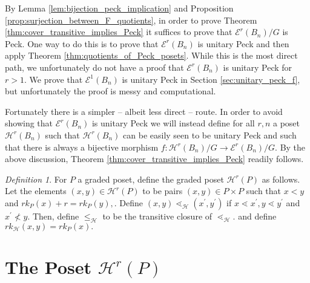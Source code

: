 \documentclass[10 pt]{amsart}
\theoremstyle{plain}
\theoremstyle{definition}
\theoremstyle{remark}
\numberwithin{equation}{section}
\theoremstyle{remark}
\newtheorem{defn}[thm]{Definition}
\begin{document}
By Lemma \ref{lem:bijection_peck_implication} and Proposition \ref{prop:surjection_between_F_quotients}, in order to prove Theorem \ref{thm:cover_transitive_implies_Peck} it suffices to prove that $\mathcal E^r(B_n)/G$ is Peck.  One way to do this is to prove that $\mathcal E^r(B_n)$ is unitary Peck and then apply Theorem \ref{thm:quotients_of_Peck_posets}.  While this is the most direct path, we unfortunately do not have a proof that $\mathcal E^r(B_n)$ is unitary Peck for $r>1$.  We prove that $\mathcal E^1(B_n)$ is unitary Peck in Section \ref{sec:unitary_peck_f}, but unfortunately the proof is messy and computational.



Fortunately there is a simpler -- albeit less direct -- route.  In order to avoid showing that $\mathcal E^r(B_n)$ is unitary Peck we will instead define for all $r,n$ a poset $\mathcal{H}^r(B_n)$ such that $\mathcal{H}^r(B_n)$ can be easily seen to be unitary Peck and such that there is always a bijective morphism $f\colon \mathcal{H}^r(B_n)/G\rightarrow \mathcal E^r(B_n)/G$.  By the above discussion, Theorem \ref{thm:cover_transitive_implies_Peck} readily follows.


\begin{defn}
\label{defn:h_map}
For $P$ a graded poset, define the graded poset $\mathcal H^r(P)$ as follows. Let the elements $(x, y) \in \mathcal H^r(P)$ to be pairs $(x,y) \in P\times P$ such that $x <y$ and $rk_P(x) + r = rk_P(y),$.  Define $(x, y) \lessdot_{\mathcal H} (x^\prime, y^\prime)$ if $x \lessdot x^\prime,y\lessdot y^\prime$ and $x^\prime \not < y.$ Then, define $\leq_{\mathcal H}$ to be the transitive closure of $\lessdot_{\mathcal H}.$ and define $rk_{\mathcal H}(x, y) = rk_P(x).$
\end{defn}


\section{The Poset $\mathcal{H}^r(P)$}
\end{document}
